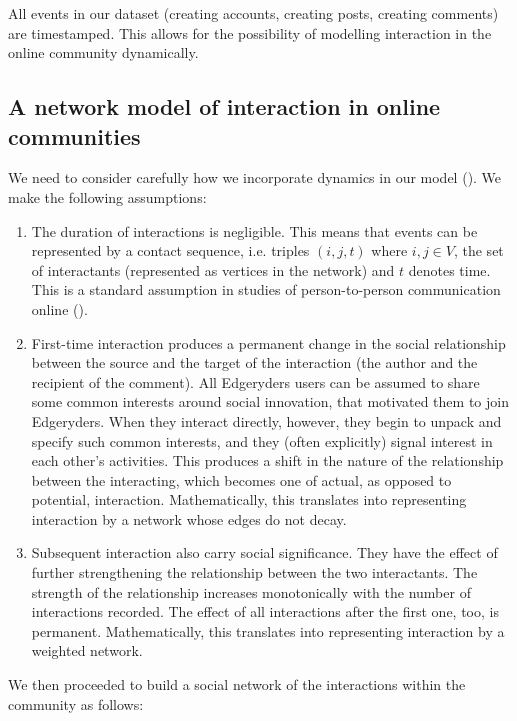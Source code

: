 All events in our dataset (creating accounts, creating posts, creating comments) are timestamped. This allows for the possibility of modelling interaction in the online community dynamically. 

\subsection{A network model of interaction in online communities}

We need to consider carefully how we incorporate dynamics in our model (\cite{holme2012temporal}). We make the following assumptions:

\begin{enumerate}
	\item The duration of interactions is negligible. This means that events can be represented by a contact sequence, i.e. triples $(i, j, t)$ where $i, j \in V$, the set of interactants (represented as vertices in the network) and $t$ denotes time. This is a standard assumption in studies of person-to-person communication online (\cite{holme2012temporal}). 
	\item First-time interaction produces a permanent change in the social relationship between the source and the target of the interaction (the author and the recipient of the comment). All Edgeryders users can be assumed to share some common interests around social innovation, that motivated them to join Edgeryders. When they interact directly, however, they begin to unpack and specify such common interests, and they (often explicitly) signal interest in each other's activities. This produces a shift in the nature of the relationship between the interacting, which becomes one of actual, as opposed to potential, interaction. Mathematically, this translates into representing interaction by a network whose edges do not decay.
	\item Subsequent interaction also carry social significance. They have the effect of further strengthening the relationship between the two interactants. The strength of the relationship increases monotonically with the number of interactions recorded. The effect of all  interactions after the first one, too, is permanent. Mathematically, this translates into representing interaction by a weighted network.
\end{enumerate}

We then proceeded to build a social network of the interactions within the community as follows:


